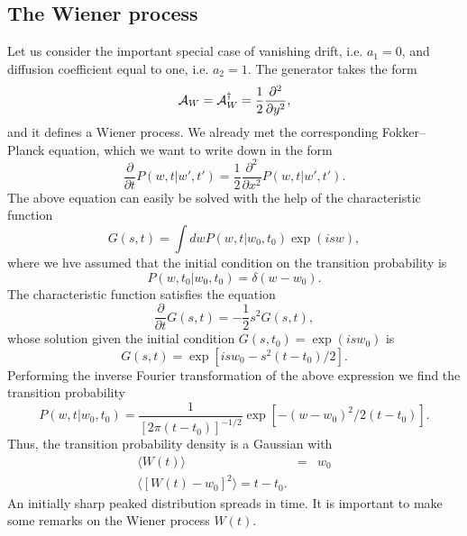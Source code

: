\subsection{The Wiener process}
Let us consider the important special case 
of vanishing drift, i.e. $a_1=0$, and diffusion coefficient
equal to one, i.e. $a_2=1$. The generator takes the form 
\begin{equation}
\label{WIENER_GENERATOR}
{\cal{A}}_W = {\cal{A}}_W^{\dagger} = \frac{1}{2} 
     \frac{\partial^2}{\partial y^2},
\end{equation}
and it defines a Wiener process. We already met the corresponding
Fokker--Planck equation, which we want to write down in the form
\begin{equation*}
\frac{\partial}{\partial t}P(w,t|w',t') =
  \frac{1}{2} \frac{\partial^2}{\partial x^2} P(w,t|w',t').
\end{equation*}
The above equation can easily be solved with the help of the 
characteristic function
\begin{equation*}
G(s,t) = \int dw P(w,t|w_0,t_0) \exp(isw),
\end{equation*}
where we hve assumed that the initial condition on the transition 
probability is
\begin{equation*}
P(w,t_0|w_0,t_0) = \delta(w-w_0).
\end{equation*}
The characteristic function satisfies the equation
\begin{equation*}
\frac{\partial}{\partial t}G(s,t) = - \frac{1}{2} s^2 G(s,t),
\end{equation*}
whose solution given the initial condition $G(s,t_0)=\exp(isw_0)$ is
\begin{equation*}
G(s,t) = \exp\left[isw_0 -s^2(t-t_0)/2\right].
\end{equation*}
Performing the inverse Fourier transformation of the above 
expression we find the transition probability
\begin{equation}
\label{TREANS_WIENER}
P(w,t|w_0,t_0)= \frac{1}{[2 \pi (t-t_0)]^{-1/2}}
     \exp\left[ -(w-w_0)^2/2(t-t_0)\right].
\end{equation}
Thus, the transition probability density is a Gaussian with
\begin{eqnarray*}
\langle W(t) \rangle &=& w_0 \\
\langle [W(t)-w_0]^2\rangle = t-t_0.
\end{eqnarray*}
An initially sharp peaked distribution spreads in time.
It is important to make some remarks on the Wiener process $W(t)$.


